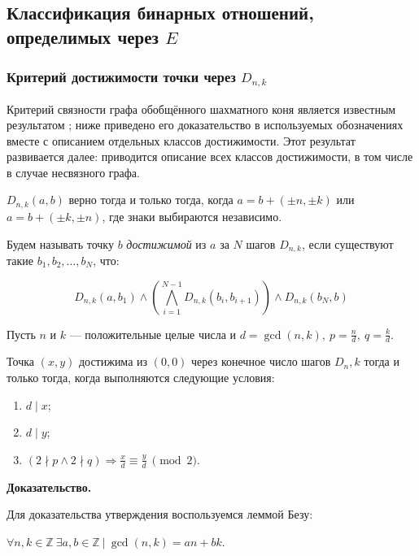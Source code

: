 \newcommand{\Int}{\mathbb{Z}}
\newcommand{\Gdist}{d}

\subsection{Классификация бинарных отношений, определимых через $E$}
\subsubsection{Критерий достижимости точки через $D_{n,k}$}
Критерий связности графа обобщённого шахматного коня является известным
результатом \cite{Connectivity_Knight_Graphs_Rhodes_Wilson}; ниже приведено его доказательство в используемых
обозначениях вместе с описанием отдельных классов достижимости. Этот результат развивается далее: приводится описание всех классов достижимости,
в том числе в случае несвязного графа.
\bigskip

$D_{n,k}(a, b)$ верно тогда и только тогда, когда $a = b + (\pm n,\pm k)$ или $a = b + (\pm k,\pm n)$, где знаки выбираются независимо.

Будем называть точку $b$ \textit{достижимой} из $a$ за $N$ шагов $D_{n,k}$, если существуют такие $b_1, b_2, \dots, b_N$, что:

$$D_{n,k}(a, b_1) \wedge (\bigwedge \limits_{i = 1}^{N - 1} D_{n,k}(b_i, b_{i + 1})) \wedge D_{n,k}(b_N, b)$$

\begin{theorem}
    Пусть $n$ и $k$ --- положительные целые числа и $d = \gcd(n,k),\  p = \frac{n}{d},\ q = \frac{k}{d}$.

    Точка $(x,y)$ достижима из $(0,0)$ через конечное число шагов $D_n,k$ тогда и только тогда, когда выполняются следующие условия:

    \begin{enumerate}
        \item $d \mid x$;
        \item $d \mid y$;
        \item $(2 \nmid p \wedge 2 \nmid q) \Longrightarrow \frac{x}{d} \equiv \frac{y}{d}\ \pmod{2}$.
    \end{enumerate}
\end{theorem}

\textbf{Доказательство.}

Для доказательства утверждения воспользуемся леммой Безу:

\begin{namedLemma}
    $\forall n,k \in \mathbb{Z}\ \exists a, b \in \mathbb{Z}\ |\ \gcd(n, k) = an + bk$.
\end{namedLemma}


